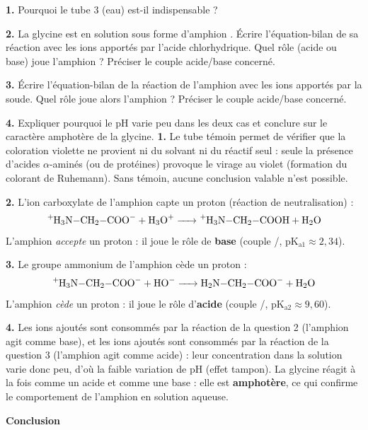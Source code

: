 \documentclass[11pt]{article}
\begin{document}
\begin{exoresolu}
\textbf{1.} Pourquoi le tube 3 (eau) est-il indispensable ? \par
\textbf{2.} La glycine est en solution sous forme d'amphion . Écrire l'équation-bilan de sa réaction avec les ions  apportés par l'acide chlorhydrique. Quel rôle (acide ou base) joue l'amphion ? Préciser le couple acide/base concerné. \par
\textbf{3.} Écrire l'équation-bilan de la réaction de l'amphion avec les ions  apportés par la soude. Quel rôle joue alors l'amphion ? Préciser le couple acide/base concerné. \par
\textbf{4.} Expliquer pourquoi le pH varie peu dans les deux cas et conclure sur le caractère amphotère de la glycine.
\tcblower
\textbf{1.} Le tube témoin permet de vérifier que la coloration violette ne provient ni du solvant ni du réactif seul : seule la présence d'acides $\alpha$-aminés (ou de protéines) provoque le virage au violet (formation du colorant de Ruhemann). Sans témoin, aucune conclusion valable n'est possible. \par
\textbf{2.} L'ion carboxylate  de l'amphion capte un proton (réaction de neutralisation) :
\[ \ce{^{+}H3N-CH2-COO- + H3O+ -> ^{+}H3N-CH2-COOH + H2O} \]
L'amphion \emph{accepte} un proton : il joue le rôle de \textbf{base} (couple /, pK$_{\text{a}1} \approx 2,34$). \par
\textbf{3.} Le groupe ammonium  de l'amphion cède un proton :
\[ \ce{^{+}H3N-CH2-COO- + HO- -> H2N-CH2-COO- + H2O} \]
L'amphion \emph{cède} un proton : il joue le rôle d'\textbf{acide} (couple /, pK$_{\text{a}2} \approx 9,60$). \par
\textbf{4.} Les ions  ajoutés sont consommés par la réaction de la question 2 (l'amphion agit comme base), et les ions  ajoutés sont consommés par la réaction de la question 3 (l'amphion agit comme acide) : leur concentration dans la solution varie donc peu, d'où la faible variation de pH (effet tampon). La glycine réagit à la fois comme un acide et comme une base : elle est \textbf{amphotère}, ce qui confirme le comportement de l'amphion en solution aqueuse.
\end{exoresolu}

\textbf{Conclusion}\par
\end{document}
